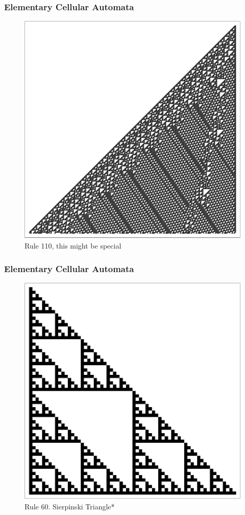 \documentclass{beamer}
\begin{document}
\begin{frame}
    \frametitle{Elementary Cellular Automata}
    \begin{figure}
        \centering
        \includegraphics[scale=0.45]{fig4.pdf}
        \caption{Rule 110, this might be special}
    \end{figure}
\end{frame}

\begin{frame}
    \frametitle{Elementary Cellular Automata}
    \begin{figure}
        \includegraphics[scale=0.45]{seir.pdf}
        \caption{Rule 60. Sierpinski Triangle*}
    \end{figure}
\end{frame}
\end{document}
